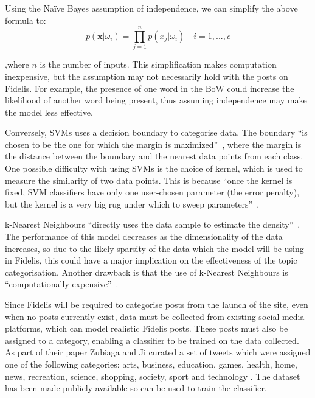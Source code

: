 \noindent Using the Na\"ive Bayes assumption of independence, we can simplify the above formula to:  
\begin{equation}
\label{eq:bayes-simple}
p(\mathbf{x}|\omega_{i})=\prod_{j=1}^{n}p(x_{j}|\omega_{i})\quad i=1,...,c
\end{equation}

\noindent ,where $n$ is the number of inputs. This simplification makes computation inexpensive, but the assumption may not necessarily hold with the posts on Fidelis. For example, the presence of one word in the BoW could increase the likelihood of another word being present, thus assuming independence may make the model less effective.

Conversely, SVMs uses a decision boundary to categorise data. The boundary ``is chosen to be the one for which the margin is maximized''~\cite{Bishop:SVM}, where the margin is the distance between the boundary and the nearest data points from each class. One possible difficulty with using SVMs is the choice of kernel, which is used to measure the similarity of two data points. This is because ``once the kernel is fixed, SVM classifiers have only one user-chosen parameter (the error penalty), but the kernel is a very big rug under which to sweep parameters''~\cite{Burges:SVM}.

k-Nearest Neighbours ``directly uses the data sample to estimate the density''~\cite{Zaki:KNN}. The performance of this model decreases as the dimensionality of the data increases, so due to the likely sparsity of the data which the model will be using in Fidelis, this could have a major implication on the effectiveness of the topic categorisation. Another drawback is that the use of k-Nearest Neighbours is ``computationally expensive''~\cite{Kuncheva:KNN}.

Since Fidelis will be required to categorise posts from the launch of the site, even when no posts currently exist, data must be collected from existing social media platforms, which can model realistic Fidelis posts. These posts must also be assigned to a category, enabling a classifier to be trained on the data collected. As part of their paper Zubiaga and Ji curated a set of tweets which were assigned one of the following categories: arts, business, education, games, health, home, news, recreation, science, shopping, society, sport and technology \cite{Zubiaga:Tweets}. The dataset has been made publicly available so can be used to train the classifier.

